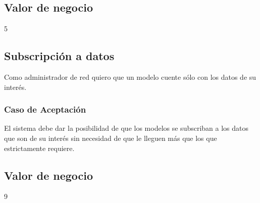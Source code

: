 \subsection*{Valor de negocio}
5


\linea 
\subsection*{Subscripción a datos}
Como administrador de red
quiero que un modelo cuente sólo con los datos de su interés.
\subsubsection*{Caso de Aceptación}
El sistema debe dar la posibilidad de que los modelos se subscriban a los datos que son de su interés sin necesidad de que le lleguen más que los que estrictamente requiere.
\subsection*{Valor de negocio}
9



